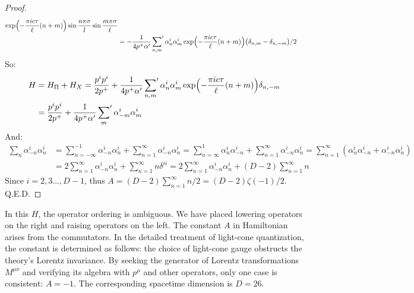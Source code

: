 \begin{tcolorbox}[breakable]
\begin{proof}
\begin{align*}
			\exp \Bigl(-\frac{\pi i c \tau}{\ell}(n+m)\Bigr) \sin \frac{n \pi \sigma}{l}\sin \frac{m \pi \sigma}{\ell} \\
			&=-\frac{1}{4p^{+}\alpha^\prime  }  \sideset{}{'}\sum _{n,m} \alpha_{n}^{i}\alpha_{m}^{i} 
			\exp \Bigl(-\frac{\pi i c \tau}{\ell}(n+m)\Bigr) \bigl(\delta_{n,m}-\delta_{n,-m}\bigr)/2
		\end{align*}
		So:
		\begin{align*}
			H&=H_{\Pi}+H_{X}=\frac{p^{i}p^{i}}{2p^{+}} +\frac{1}{4p^{+}\alpha'}\sideset{}{'}\sum_{n,m} \alpha_{n}^{i} \alpha_{m}^{i}\exp\Bigl(-\frac{\pi i c \tau}{\ell}(n+m)\Bigr)\delta_{n,-m} \\
			&=\frac{p^{i}p^{i}}{2p^{+}} +\frac{1}{4p^{+}\alpha'}\sideset{}{'}\sum_{m} \alpha_{-m}^{i} \alpha_{m}^{i}
		\end{align*}
		And:
		\begin{align*}
			\sum_{n} \alpha_{-n}^{i} \alpha_{n}^{i}&=\sum_{n=-\infty}^{-1} \alpha_{-n}^{i} \alpha_{n}^{i}+\sum_{n=1}^{\infty} \alpha_{-n}^{i} \alpha_{n}^{i}=\sum_{n=\infty}^{1} \alpha_{n}^{i} \alpha_{-n}^{i}+\sum_{n=1}^{\infty} \alpha_{-n}^{i} \alpha_{n}^{i}=\sum_{n=1}^{\infty} (\alpha_{n}^{i} \alpha_{-n}^{i}+\alpha_{-n}^{i} \alpha_{n}^{i})\\
			&=2 \sum_{n=1}^{\infty} \alpha_{-n}^{i} \alpha_{n}^{i}+\sum_{n=1}^{\infty} n\delta^{ii}=2 \sum_{n=1}^{\infty} \alpha_{-n}^{i} \alpha_{n}^{i}+(D-2)\sum_{n=1}^{\infty} n
		\end{align*}
		Since $i=2,3...,D-1$, thus $A=(D-2)\sum_{n=1}^{\infty}n/2=(D-2)\zeta(-1)/2$. 
		Q.E.D.
	\end{proof}
\end{tcolorbox}
\noindent In this $H$, the operator ordering is ambiguous. We have placed lowering operators on the right and raising operators on the left. The constant $A$ in Hamiltonian arises from the commutators. In the detailed treatment of light-cone quantization, the constant is determined as follows: the choice of light-cone gauge obstructs the theory's Lorentz invariance. By seeking the generator of Lorentz transformations $M^{\mu\nu}$ and verifying its algebra with $p^\mu$ and other operators, only one case is consistent: $A=-1$. The corresponding spacetime dimension is $D=26$. 

